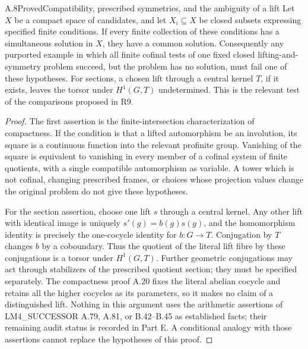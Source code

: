 \begin{result}{A.8}{Proved}{Compatibility, prescribed symmetries, and the ambiguity of a lift}
Let \(X\) be a compact space of candidates, and let
\(X_i\subseteq X\) be closed subsets expressing specified finite
conditions. If every finite collection of these conditions has a
simultaneous solution in \(X\), they have a common solution.
Consequently any purported example in which all finite cofinal tests
of one fixed closed lifting-and-symmetry problem succeed, but the
problem has no solution, must fail one of these hypotheses.
For sections, a chosen lift through a central kernel \(T\), if it
exists, leaves the torsor under \(H^1(G,T)\) undetermined.
This is the relevant test of the comparisons proposed in R9.
\end{result}
\begin{proof}
The first assertion is the finite-intersection characterization of
compactness. If the condition is that a lifted automorphism be an
involution, its square is a continuous function into the relevant
profinite group. Vanishing of the square is equivalent to vanishing
in every member of a cofinal system of finite quotients, with a
single compatible automorphism as variable. A tower which is not
cofinal, changing prescribed frames, or choices whose projection
values change the original problem do not give these hypotheses.

For the section assertion, choose one lift \(s\) through a central
kernel. Any other lift with identical image is uniquely
\(s'(g)=b(g)s(g)\), and the homomorphism identity is precisely the
one-cocycle identity for \(b:G\to T\). Conjugation by \(T\)
changes \(b\) by a coboundary. Thus the quotient of the literal
lift fibre by these conjugations is a torsor under \(H^1(G,T)\).
Further geometric conjugations may act through stabilizers of the
prescribed quotient section; they must be specified separately.
The compactness proof A.20 fixes the literal abelian cocycle and
retains all the higher cocycles as its parameters, so it makes no
claim of a distinguished lift. Nothing in this argument uses the
arithmetic assertions of LM4\_SUCCESSOR A.79, A.81, or B.42--B.45
as established facts; their remaining audit status is recorded in
Part E. A conditional analogy with those assertions cannot replace
the hypotheses of this proof.
\end{proof}

